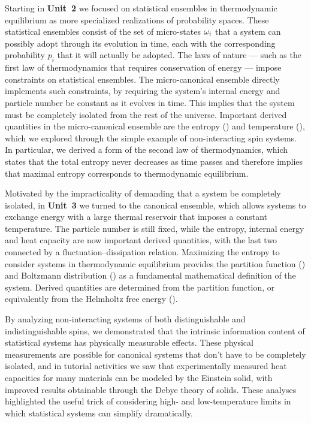 Starting in \textbf{Unit~2} we focused on statistical ensembles in thermodynamic equilibrium as more specialized realizations of probability spaces.
These statistical ensembles consist of the set of micro-states $\omega_i$ that a system can possibly adopt through its evolution in time, each with the corresponding probability $p_i$ that it will actually be adopted.
The laws of nature --- such as the first law of thermodynamics that requires conservation of energy --- impose constraints on statistical ensembles.
The micro-canonical ensemble directly implements such constraints, by requiring the system's internal energy and particle number be constant as it evolves in time.
This implies that the system must be completely isolated from the rest of the universe.
Important derived quantities in the micro-canonical ensemble are the entropy () and temperature (), which we explored through the simple example of non-interacting spin systems.
In particular, we derived a form of the second law of thermodynamics, which states that the total entropy never decreases as time passes and therefore implies that maximal entropy corresponds to thermodynamic equilibrium.

Motivated by the impracticality of demanding that a system be completely isolated, in \textbf{Unit~3} we turned to the canonical ensemble, which allows systems to exchange energy with a large thermal reservoir that imposes a constant temperature.
The particle number is still fixed, while the entropy, internal energy and heat capacity are now important derived quantities, with the last two connected by a fluctuation--dissipation relation.
Maximizing the entropy to consider systems in thermodynamic equilibrium provides the partition function () and Boltzmann distribution () as a fundamental mathematical definition of the system.
Derived quantities are determined from the partition function, or equivalently from the Helmholtz free energy ().

By analyzing non-interacting systems of both distinguishable and indistinguishable spins, we demonstrated that the intrinsic information content of statistical systems has physically measurable effects.
These physical measurements are possible for canonical systems that don't have to be completely isolated, and in tutorial activities we saw that experimentally measured heat capacities for many materials can be modeled by the Einstein solid, with improved results obtainable through the Debye theory of solids.
These analyses highlighted the useful trick of considering high- and low-temperature limits in which statistical systems can simplify dramatically.


